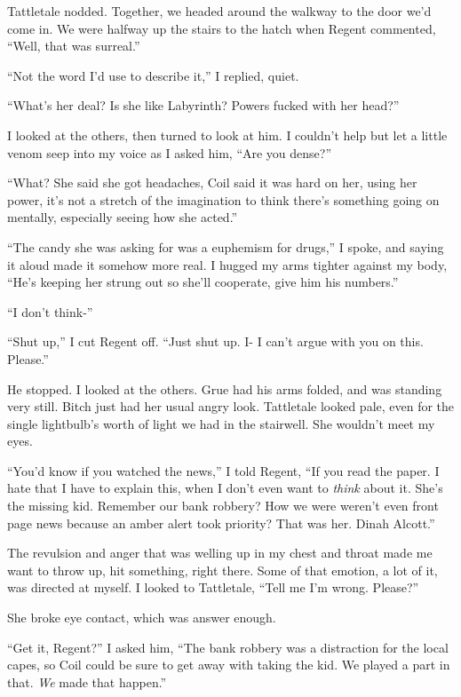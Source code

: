 Tattletale nodded.  Together, we headed around the walkway to the door we'd come in.  We were halfway up the stairs to the hatch when Regent commented, ``Well, that was surreal.''



``Not the word I'd use to describe it,'' I replied, quiet.



``What's her deal?  Is she like Labyrinth?  Powers fucked with her head?''



I looked at the others, then turned to look at him.  I couldn't help but let a little venom seep into my voice as I asked him, ``Are you dense?''



``What?  She said she got headaches, Coil said it was hard on her, using her power, it's not a stretch of the imagination to think there's something going on mentally, especially seeing how she acted.''



``The candy she was asking for was a euphemism for drugs,'' I spoke, and saying it aloud made it somehow more real.  I hugged my arms tighter against my body, ``He's keeping her strung out so she'll cooperate, give him his numbers.''



``I don't think-''



``Shut up,'' I cut Regent off.  ``Just shut up.  I- I can't argue with you on this.  Please.''



He stopped.  I looked at the others.  Grue had his arms folded, and was standing very still.  Bitch just had her usual angry look.  Tattletale looked pale, even for the single lightbulb's worth of light we had in the stairwell.  She wouldn't meet my eyes.



``You'd know if you watched the news,'' I told Regent, ``If you read the paper.  I hate that I have to explain this, when I don't even want to \emph{think} about it.  She's the missing kid.  Remember our bank robbery?  How we were weren't even front page news because an amber alert took priority?  That was her.  Dinah Alcott.''



The revulsion and anger that was welling up in my chest and throat made me want to throw up, hit something, right there.  Some of that emotion, a lot of it, was directed at myself.  I looked to Tattletale, ``Tell me I'm wrong.  Please?''



She broke eye contact, which was answer enough.



``Get it, Regent?'' I asked him, ``The bank robbery was a distraction for the local capes, so Coil could be sure to get away with taking the kid.  We played a part in that. \emph{We} made that happen.''





